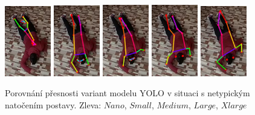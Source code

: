 \begin{figure}
    \centering
    \includegraphics[width=0.18\textwidth]{Figures/pose_tests/y_n.png}
    \includegraphics[width=0.18\textwidth]{Figures/pose_tests/y_s.png}
    \includegraphics[width=0.18\textwidth]{Figures/pose_tests/y_m.png}
    \includegraphics[width=0.18\textwidth]{Figures/pose_tests/y_l.png}
    \includegraphics[width=0.18\textwidth]{Figures/pose_tests/y_x.png}
    \caption{Porovnání přesnosti variant modelu YOLO v situaci s netypickým natočením postavy. Zleva: $Nano$, $Small$, $Medium$, $Large$, $Xlarge$}
    \label{fig:y_comparison}
\end{figure}

